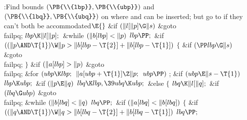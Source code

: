 \Y\B\4:Find bounds $(\PB{\\{lbp}},\PB{\\{ubp}})$ and $(\PB{\\{lbq}},\PB{%
\\{ubq}})$ on where  and  can be inserted; but go to  if they can't both be accommodated\X${}\E{}$\6
\&{if} ${}(\|l[\|p]\G\|s){}$\1\5
\&{goto} \\{failpq};\2\6
${}\\{lbp}\K\|l[\|p];{}$\6
\&{while} ${}(\|b[\\{lbp}]<\|p){}$\1\5
${}\\{lbp}\PP;{}$\2\6
\&{if} ${}((\|p\AND\T{1})\W\|p>\|b[\\{lbp}-\T{2}]+\|b[\\{lbp}-\T{1}]){}$\5
${}\{{}$\1\6
\&{if} ${}(\PP\\{lbp}\G\|s){}$\1\5
\&{goto} \\{failpq};\2\6
\4${}\}{}$\2\6
\&{if} ${}(\|a[\\{lbp}]>\|p){}$\1\5
\&{goto} \\{failpq};\2\6
\&{for} ${}(\\{ubp}\K\\{lbp};{}$ ${}\|a[\\{ubp}+\T{1}]\Z\|p;{}$ ${}\\{ubp}%
\PP){}$\1\5
;\2\6
\&{if} ${}(\\{ubp}\E\|s-\T{1}){}$\1\5
${}\\{lbp}\K\\{ubp};{}$\2\6
\&{if} ${}(\|p\E\|q){}$\1\5
${}\\{lbq}\K\\{lbp},\39\\{ubq}\K\\{ubp};{}$\2\6
\&{else}\5
${}\{{}$\1\6
${}\\{lbq}\K\|l[\|q];{}$\6
\&{if} ${}(\\{lbq}\G\\{ubp}){}$\1\5
\&{goto} \\{failpq};\2\6
\&{while} ${}(\|b[\\{lbq}]<\|q){}$\1\5
${}\\{lbq}\PP;{}$\2\6
\&{if} ${}(\|a[\\{lbq}]<\|b[\\{lbq}]){}$\5
${}\{{}$\1\6
\&{if} ${}((\|q\AND\T{1})\W\|q>\|b[\\{lbq}-\T{2}]+\|b[\\{lbq}-\T{1}]){}$\1\5
${}\\{lbq}\PP;{}$\2\6
